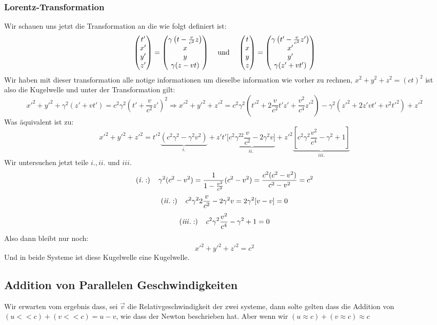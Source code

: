 \documentclass{article}
\newcommand{\mspc}{\hspace{0.4cm}}
\begin{document}
\subsubsection{Lorentz-Transformation}
Wir schauen uns jetzt die Transformation an die wie folgt definiert ist:
\[\begin{pmatrix}t'\\x'\\y'\\z'\end{pmatrix}=\begin{pmatrix}\gamma\left(t-\frac{v}{c^2}z\right)\\x\\y\\\gamma(z-vt)\end{pmatrix}\mspc\text{und}\mspc \begin{pmatrix}t\\x\\y\\z\end{pmatrix}=\begin{pmatrix}\gamma\left(t'-\frac{v}{c^2}z'\right)\\x'\\y'\\\gamma(z'+vt')\end{pmatrix}\]
Wir haben mit dieser transformation alle notige informationen um dieselbe information wie vorher zu rechnen, $x^2+y^2+z^2=(ct)^2$ ist also die Kugelwelle und unter der Transformation gilt:
\[x'^2+y'^2+\gamma^2(z'+vt')=c^2\gamma^2\left(t'+\frac{v}{c^2}z'\right)^2\Rightarrow x'^2+y'^2+z'^2=c^2\gamma^2\left(t'^2+2\frac{v}{c^2}t'z'+\frac{v^2}{c^4}z'^2\right)-\gamma^2(z'^2+2z'vt'+v^2t'^2)+z'^2\]
Was äquivalent ist zu:
\[x'^2+y'^2+z'^2=t'^2\underset{\mathit{i.}}{\underbrace{(c^2\gamma^2-\gamma^2v^2)}}+z't'\underset{\mathit{ii.}}{[\underbrace{c^2\gamma^22\frac{v}{c^2}-2\gamma^2v]}}+z'^2\underset{\mathit{iii.}}{\underbrace{[c^2\gamma^2\frac{v^2}{c^4}-\gamma^2+1]}}\]
Wir untersuchen jetzt teile $\mathit{i., ii.}$ und $\mathit{iii.}$
\[(\mathit{i.:})\mspc\gamma^2 (c^2-v^2)=\frac{1}{1-\frac{v^2}{c^2}}(c^2-v^2)=\frac{c^2(c^2-v^2)}{c^2-v^2}=c^2\]
\[(\mathit{ii.:}) \mspc c^2\gamma^22\frac{v}{c^2}-2\gamma^2v=2\gamma^2[v-v]=0\]
\[(\mathit{iii.:})\mspc c^2\gamma^2\frac{v^2}{c^4}-\gamma^2+1=0\]
Also dann bleibt nur noch:\[x'^2+y'^2+z'^2=c^2\] Und in beide Systeme ist diese Kugelwelle eine Kugelwelle.
\subsection{Addition von Parallelen Geschwindigkeiten} Wir erwarten vom ergebnis dass, sei $\vec{v}$ die Relativgeschwindigkeit der zwei systeme, dann solte gelten dass die Addition von $(u<<c) + (v<<c)=u-v$, wie dass der Newton beschrieben hat. Aber wenn wir $(u\approx c)+(v\approx c)\approx c$
\end{document}
